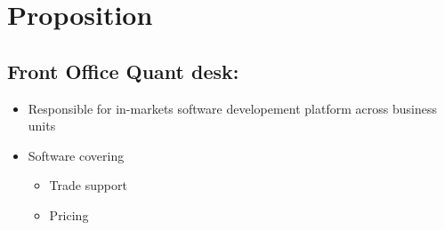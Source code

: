\documentclass[11pt]{article}
\begin{document}
\subsection{}
\label{sec:org697a67d}

\section{Proposition}
\label{sec:org208da8a}
\subsection{Front Office Quant desk:}
\label{sec:org07ae66d}
\begin{itemize}
\item Responsible for in-markets software developement platform across business units
\item Software covering
\begin{itemize}
\item Trade support
\item Pricing
\end{itemize}
\end{itemize}
\end{document}
